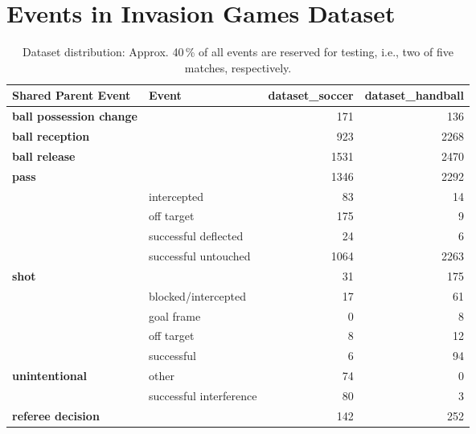 \section{Events in Invasion Games Dataset}\label{sec:datasets}

\begin{table}[b]
\caption{Dataset distribution: Approx. 40\,\% of all events are reserved for testing, i.e., two of five matches, respectively.}
\label{tab:stats}
\centering
\small
\fontsize{7}{10}\selectfont
\def\arraystretch{0.7}

\begin{tabularx}{\linewidth}{Xlrr}
\toprule
Shared Parent Event & Event &    \acrshort{dataset_soccer} &  \acrshort{dataset_handball} \\
\midrule \midrule
\textbf{ball possession change} &  &            171 &              136 \\ \hline
\textbf{ball reception} &  &           923 &            2268 \\ \hline
\textbf{ball release} &  &           1531 &            2470 \\ \hline
\textbf{pass} &  &            1346 &              2292 \\
 & intercepted &            83 &              14 \\
                           & off target &           175 &               9 \\
                           & successful deflected &            24 &               6 \\
                           & successful untouched &          1064 &            2263 \\
\textbf{shot} &  &            31 &              175 \\
                           & blocked/intercepted &   17 &              61 \\
                           & goal frame &             0 &               8 \\
                           & off target &             8 &              12 \\
                           & successful &             6 &              94 \\
\textbf{unintentional} & other &            74 &               0 \\
                           & successful interference &            80 &               3 \\ \hline
\textbf{referee decision}         &        &            142 &               252 \\ \hline

\end{tabularx}
\end{table}
